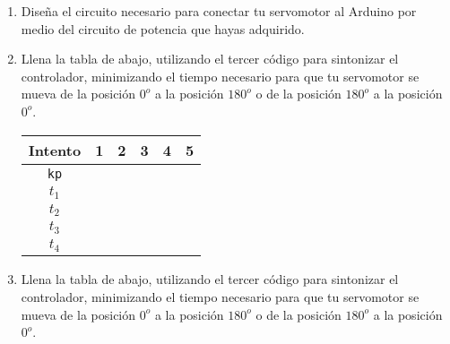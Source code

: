 \begin{enumerate}
		\item Diseña el circuito necesario para conectar tu servomotor al Arduino por medio del circuito de potencia que hayas adquirido. \\ \vspace{3cm}

		\item Llena la tabla de abajo, utilizando el tercer código para sintonizar el controlador, minimizando el tiempo necesario para que tu servomotor se mueva de la posición $0^o$ a la posición $180^o$ o de la posición $180^o$ a la posición $0^o$.

		\begin{center}
			\begin{tabular}{|c|c|c|c|c|c|}
				 \hline
				 Intento & 1 & 2 & 3 & 4 & 5 \\
				 \hline
				 \texttt{kp} & \hspace{1.7cm} & \hspace{1.7cm} & \hspace{1.7cm} & \hspace{1.7cm} & \hspace{1.7cm} \\
				 \hline
				 $t_1$ & & & & & \\
				 \hline
				 $t_2$ & & & & & \\
				 \hline
				 $t_3$ & & & & & \\
				 \hline
				 $t_4$ & & & & & \\
				 \hline
			\end{tabular}
		\end{center}

		\item Llena la tabla de abajo, utilizando el tercer código para sintonizar el controlador, minimizando el tiempo necesario para que tu servomotor se mueva de la posición $0^o$ a la posición $180^o$ o de la posición $180^o$ a la posición $0^o$.


\end{enumerate}

